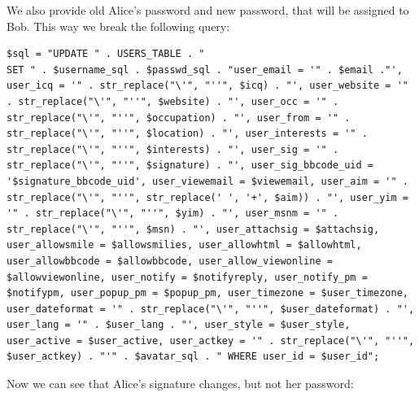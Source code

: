 \documentclass[12pt, a4paper, pdflatex]{article}
\begin{document}
We also provide old Alice's password and new password, that will be assigned to Bob. This way we break the following query:
\lstset{
	captionpos=b,
	frame=single,
	language=PHP,
	breaklines=true,
	label=sql1
}
\begin{lstlisting}
$sql = "UPDATE " . USERS_TABLE . "
SET " . $username_sql . $passwd_sql . "user_email = '" . $email ."', user_icq = '" . str_replace("\'", "''", $icq) . "', user_website = '" . str_replace("\'", "''", $website) . "', user_occ = '" . str_replace("\'", "''", $occupation) . "', user_from = '" . str_replace("\'", "''", $location) . "', user_interests = '" . str_replace("\'", "''", $interests) . "', user_sig = '" . str_replace("\'", "''", $signature) . "', user_sig_bbcode_uid = '$signature_bbcode_uid', user_viewemail = $viewemail, user_aim = '" . str_replace("\'", "''", str_replace(' ', '+', $aim)) . "', user_yim = '" . str_replace("\'", "''", $yim) . "', user_msnm = '" . str_replace("\'", "''", $msn) . "', user_attachsig = $attachsig, user_allowsmile = $allowsmilies, user_allowhtml = $allowhtml, user_allowbbcode = $allowbbcode, user_allow_viewonline = $allowviewonline, user_notify = $notifyreply, user_notify_pm = $notifypm, user_popup_pm = $popup_pm, user_timezone = $user_timezone, user_dateformat = '" . str_replace("\'", "''", $user_dateformat) . "', user_lang = '" . $user_lang . "', user_style = $user_style, user_active = $user_active, user_actkey = '" . str_replace("\'", "''", $user_actkey) . "'" . $avatar_sql . " WHERE user_id = $user_id";
\end{lstlisting}
Now we can see that Alice's signature changes, but not her password:\\
\end{document}
